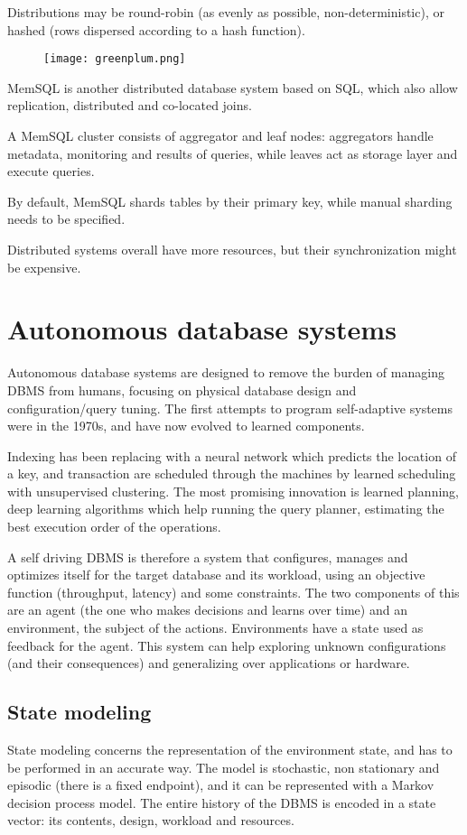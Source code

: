Distributions may be round-robin (as evenly as possible, non-deterministic), or hashed (rows dispersed according to a hash function).

\begin{figure}[h]
	\texttt{[image: greenplum.png]}
	\centering
\end{figure}

MemSQL is another distributed database system based on SQL, which also allow replication, distributed and co-located joins.

A MemSQL cluster consists of aggregator and leaf nodes: aggregators handle metadata, monitoring and results of queries, while leaves act as storage layer and execute queries. 

By default, MemSQL shards tables by their primary key, while manual sharding needs to be specified.

Distributed systems overall have more resources, but their synchronization might be expensive.

\section{Autonomous database systems}
Autonomous database systems are designed to remove the burden of managing DBMS from humans, focusing on physical database design and configuration/query tuning. The first attempts to program self-adaptive systems were in the 1970s, and have now evolved to learned components. 

Indexing has been replacing with a neural network which predicts the location of a key, and transaction are scheduled through the machines by learned scheduling with unsupervised clustering. The most promising innovation is learned planning, deep learning algorithms which help running the query planner, estimating the best execution order of the operations. 

A self driving DBMS is therefore a system that configures, manages and optimizes itself for the target database and its workload, using an objective function (throughput, latency) and some constraints. The two components of this are an agent (the one who makes decisions and learns over time) and an environment, the subject of the actions. Environments have a state used as feedback for the agent. This system can help exploring unknown configurations (and their consequences) and generalizing over applications or hardware.

\subsection{State modeling}
State modeling concerns the representation of the environment state, and has to be performed in an accurate way. The model is stochastic, non stationary and episodic (there is a fixed endpoint), and it can be represented with a Markov decision process model. The entire history of the DBMS is encoded in a state vector: its contents, design, workload and resources.

